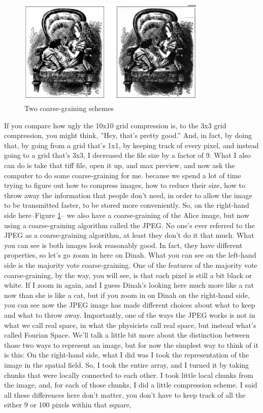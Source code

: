 \documentclass[]{article}
\begin{document}
\begin{figure}[h]
	\begin{center}
		\caption{Two coarse-graining schemes}\label{fig:alice:2:schemes}
		\includegraphics[width=0.8\textwidth]{Alice6}
	\end{center}
\end{figure}
If you compare how ugly
the 10x10 grid compression is,
to the 3x3 grid compression,
you might think,
''Hey, that's pretty good.''
And, in fact, by doing that,
by going from a grid that's 1x1,
by keeping track of every pixel,
and instead going to a grid that's 3x3,
I decreased the file size
by a factor of 9.
What I also can do is take that tiff file,
open it up, and max preview,
and now ask the computer
to do some coarse-graining for me.
because we spend a lot of time trying
to figure out how to compress images,
how to reduce their size,
how to throw away the information
that people don't need,
in order to allow the image
to be transmitted faster,
to be stored more conveniently.
So, on the right-hand side here--Figure \ref{fig:alice:2:schemes}--
we also have a coarse-graining of the Alice image, but now using a coarse-graining algorithm called the JPEG.
No one's ever referred to the JPEG as a coarse-graining algorithm, at least they don't do it that much.
What you can see is both images look reasonably good.
In fact, they have different properties,
so let's go zoom in here on Dinah.
What you can see on the left-hand side
is the majority vote coarse-graining.
One of the features of the majority vote
coarse-graining, by the way, you will see,
is that each pixel
is still a bit black or white.
If I zoom in again,
and I guess Dinah's looking here much more
like a rat now than she is like a cat,
but if you zoom in on Dinah
on the right-hand side,
you can see now the JPEG image
has made different choices
about what to keep and what to throw away.
Importantly, one of the ways
the JPEG works
is not in what we call real space,
in what the physicists call real space,
but instead what's called Fourian Space.
We'll talk a little bit more
about the distinction between
those two ways to represent an image,
but for now the simplest way
to think of it is this:
On the right-hand side,
what I did was I took the representation
of the image in the spatial field.
So, I took the entire array,
and I turned it by taking chunks
that were locally connected to each other.
I took little local chunks from the image,
and, for each of those chunks,
I did a little compression scheme.
I said all these differences here
don't matter,
you don't have to keep track
of all the either 9 or 100 pixels
within that square,
\end{document}
